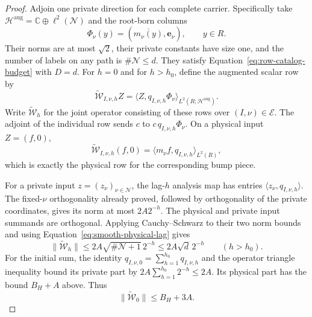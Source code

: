 \begin{proof}
Adjoin one private direction for each complete carrier.
Specifically take
$\mathcal H^{\mathrm{aug}}=\mathbb C\oplus\ell^2(\mathcal N)$
and the root-born columns
\[
 \Phi_\nu(y)=(\overline{m_\nu(y)},\mathbf e_\nu),\qquad y\in R.
\]
Their norms are at most $\sqrt2$, their private constants have
size one, and the number of labels on any path is
$\#\mathcal N\le d$.  They satisfy
Equation~\eqref{eq:row-catalog-budget} with $D=d$.
For $h=0$ and for $h>h_0$, define the augmented scalar row by
\[
\widetilde{\mathcal W}_{I,\nu,h}Z
 =\langle Z,q_{I,\nu,h}\Phi_\nu\rangle_{L^2(R;\mathcal H^{\mathrm{aug}})}.
\]
Write $\widetilde{\mathcal W}_h$ for the joint operator consisting
of these rows over $(I,\nu)\in\mathcal E$.
The adjoint of the individual row sends $c$ to
$c\,q_{I,\nu,h}\Phi_\nu$.  On a physical input $Z=(f,0)$,
\[
 \widetilde{\mathcal W}_{I,\nu,h}(f,0)
 =\langle m_\nu f,q_{I,\nu,h}\rangle_{L^2(R)},
\]
which is exactly the physical row for the corresponding bump piece.

For a private input $z=(z_\nu)_{\nu\in\mathcal N}$, the lag-$h$
analysis map has entries $\langle z_\nu,q_{I,\nu,h}\rangle$.
The fixed-$\nu$ orthogonality already proved, followed by
orthogonality of the private coordinates, gives its norm at
most $2A2^{-h}$.  The physical and private input summands are
orthogonal.  Applying Cauchy--Schwarz to their two norm bounds
and using Equation~\eqref{eq:smooth-physical-lag} gives
\begin{equation}
 \|\widetilde{\mathcal W}_h\|
 \le 2A\sqrt{\#\mathcal N+1}\,2^{-h}
 \le 2A\sqrt d\,2^{-h}\qquad(h>h_0).
 \label{eq:smooth-augmented-lag}
\end{equation}
For the initial sum, the identity
$q_{I,\nu,0}=\sum_{h=1}^{h_0}q_{I,\nu,h}$ and the operator
triangle inequality bound its private part by
$2A\sum_{h=1}^{h_0}2^{-h}\le2A$.  Its physical part has the
bound $B_H+A$ above.  Thus
\begin{equation}
 \|\widetilde{\mathcal W}_0\|\le B_H+3A.
 \label{eq:smooth-augmented-main}
\end{equation}


\end{proof}
